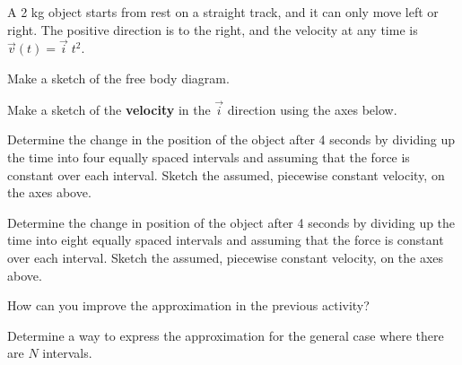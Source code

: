 \begin{problem}
\item A 2 kg object starts from rest on a straight track, and it can
  only move left or right. The positive direction is to the right, and
  the velocity at any time is $\vec{v}(t)=\vec{i} \; t^2$.

  \begin{subproblem}
    \item Make a sketch of the free body diagram.
      \vspace{4em}
    \item Make a sketch of the \textbf{velocity} in the $\vec{i}$
      direction using the axes below.

      \scalebox{0.5}{}

    \item Determine the change in the position of the object after 4
      seconds by dividing up the time into four equally spaced
      intervals and assuming that the force is constant over each
      interval. Sketch the assumed, piecewise constant velocity, on the
      axes above.  
      \vfill
    \item Determine the change in position of the object after 4
      seconds by dividing up the time into eight equally spaced
      intervals and assuming that the force is constant over each
      interval. Sketch the assumed, piecewise constant velocity, on the
      axes above.
      \vfill
  \end{subproblem}
  \clearpage

\item How can you improve the approximation in the previous activity?
  \vspace{3em}

\item Determine a way to express the approximation for the general
  case where there are $N$ intervals.

  \vfill

\end{problem}

\postClass

